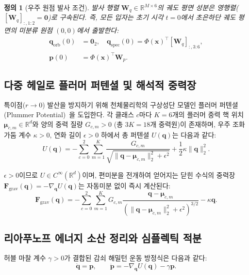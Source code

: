 \documentclass[journal]{IEEEtran}
\newtheorem{definition}{정의}
\begin{document}
\begin{definition}[우주 원점 발사 조건]
발사 행렬 $\mathbf{W}_q \in \mathbb{R}^{M \times 6}$의 궤도 평면 성분은 영행렬($[\mathbf{W}_q]_{:, 1:2} = \mathbf{0}$)로 구속된다. 즉, 모든 입자는 초기 시각 $t=0$에서 초은하단 궤도 평면의 미분류 원점 $(0, 0)$에서 출발한다:
\begin{align}
  \mathbf{q}_{\text{orb}}(0) &= \mathbf{0}_2, \quad \mathbf{q}_{\text{spec}}(0) = \Phi(\mathbf{x})^\top [\mathbf{W}_q]_{:, 3:6}, \nonumber \\
  \mathbf{p}(0) &= \Phi(\mathbf{x})^\top \mathbf{W}_p.
  \label{eq:launch_origin}
\end{align}
\end{definition}

\subsection{다중 헤일로 플러머 퍼텐셜 및 해석적 중력장}
특이점($r \to 0$) 발산을 방지하기 위해 천체물리학의 구상성단 모델인 플러머 퍼텐셜(Plummer Potential)~\cite{plummer1911}을 도입한다. 각 클래스 $c$마다 $K = 6$개의 플러머 중력 핵 위치 $\boldsymbol{\mu}_{c,m} \in \mathbb{R}^d$와 양의 중력 질량 $G_{c,m} > 0$ (총 $3K = 18$개 중력원)이 존재하며, 우주 조화 가둠 계수 $\kappa > 0$, 연화 길이 $\epsilon > 0$ 하에서 총 퍼텐셜 $U(\mathbf{q})$는 다음과 같다:
\begin{equation}
  U(\mathbf{q}) = -\sum_{c=0}^{2}\sum_{m=1}^{K} \frac{G_{c,m}}{\sqrt{\|\mathbf{q} - \boldsymbol{\mu}_{c,m}\|_2^2 + \epsilon^2}} + \frac{1}{2}\kappa \|\mathbf{q}\|_2^2.
  \label{eq:total_potential}
\end{equation}

$\epsilon > 0$이므로 $U \in C^\infty(\mathbb{R}^d)$이며, 편미분을 전개하여 얻어지는 닫힌 수식의 중력장 $\mathbf{F}_{\text{grav}}(\mathbf{q}) = -\nabla_{\mathbf{q}} U(\mathbf{q})$는 자동미분 없이 즉시 계산된다:
\begin{equation}
  \mathbf{F}_{\text{grav}}(\mathbf{q}) = -\sum_{c=0}^{2}\sum_{m=1}^{K} G_{c,m} \frac{\mathbf{q} - \boldsymbol{\mu}_{c,m}}{\left(\|\mathbf{q} - \boldsymbol{\mu}_{c,m}\|_2^2 + \epsilon^2\right)^{3/2}} - \kappa \mathbf{q}.
  \label{eq:analytic_force}
\end{equation}

\subsection{리아푸노프 에너지 소산 정리와 심플렉틱 적분}
허블 마찰 계수 $\gamma > 0$가 결합된 감쇠 해밀턴 운동 방정식은 다음과 같다:
\begin{equation}
  \dot{\mathbf{q}} = \mathbf{p}, \qquad \dot{\mathbf{p}} = -\nabla_{\mathbf{q}} U(\mathbf{q}) - \gamma \mathbf{p}.
  \label{eq:damped_eom}
\end{equation}
\end{document}
